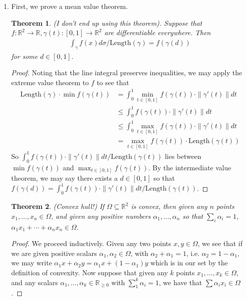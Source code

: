\documentclass[12pt]{article}
\newtheorem{theorem}{Theorem}[section]
\theoremstyle{definition}
\theoremstyle{remark}
\newcommand{\R}{\mathbb{R}}
\newcommand{\mg}[1]{\| #1 \|}
\begin{document}
\begin{enumerate}[leftmargin=\labelsep]
	\item First, we prove a mean value theorem.
	
	\begin{theorem} (I don't end up using this theorem).
		Suppose that $f:\R^2 \to \R, \gamma(t): [0, 1] \to \R^2$ are differentiable everywhere. Then 
		\begin{align*}
			\int_\gamma f(x)d\sigma / \mathrm{Length}(\gamma) = f(\gamma(d))
		\end{align*}
		for some $d \in [0, 1]$.
	\end{theorem}

	\begin{proof}
		Noting that the line integral preserves inequalities, we may apply the extreme value theorem to $f$ to see that
		\begin{align*}
			 \mathrm{Length}(\gamma) \cdot \min f(\gamma(t))&=\int_0^1 \min_{t \in [0, 1]} f(\gamma(t)) \cdot \mg{\gamma'(t)}dt \\ 
			 &\leq \int_0^1 f(\gamma(t)) \cdot \mg{\gamma'(t)}dt \\
			 &\leq \int_0^1 \max_{t \in [0, 1]} f(\gamma(t)) \cdot \mg{\gamma'(t)}dt \\
			 &= \max_{t \in [0, 1]} f(\gamma(t)) \cdot \mathrm{Length}(\gamma(t))
		\end{align*}
		So $\int_0^1 f(\gamma(t)) \cdot \mg{\gamma'(t)}dt / \mathrm{Length}(\gamma(t))$ lies between $\min f(\gamma(t))$ and $\max_{t \in [0, 1]} f(\gamma(t))$. By the intermediate value theorem, we may say there exists a $d \in [0, 1]$ so that $f(\gamma(d)) = \int_0^1 f(\gamma(t)) \cdot \mg{\gamma'(t)}dt / \mathrm{Length}(\gamma(t))$.
	\end{proof}
	
	\begin{theorem} (Convex hull!)
		If $\Omega \subseteq \R^2$ is convex, then given any $n$ points $x_1, \ldots, x_n \in \Omega$, and given any positive numbers $\alpha_1, \ldots, \alpha_n$ so that $\sum_i \alpha_i = 1$, $\alpha_1x_1 + \cdots + \alpha_nx_n \in \Omega$.
	\end{theorem}
	\begin{proof}
		We proceed inductively. Given any two points $x, y \in \Omega$, we see that if we are given positive scalars $\alpha_1, \alpha_2 \in \Omega$, with $\alpha_2 + \alpha_1 = 1$, i.e. $\alpha_2 = 1 - \alpha_1$, we may write $\alpha_1 x + \alpha_2 y = \alpha_1 x + (1-\alpha_1) y$ which is in our set by the definition of convexity. 
		Now suppose that given any $k$ points $x_1, \ldots, x_k \in \Omega$, and any scalars $\alpha_1, \ldots, \alpha_k \in \R_{\geq 0}$ with $\sum_1^k \alpha_i = 1$, we have that $\sum \alpha_i x_i \in \Omega$. 
		

\end{proof}
\end{enumerate}
\end{document}
